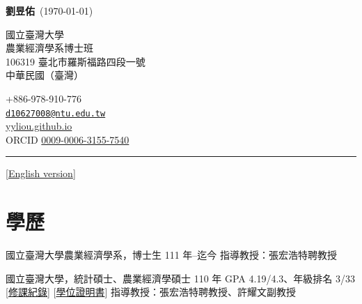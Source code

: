 \documentclass[11pt,letterpaper]{article}
\newlength{\cvindent}
\newlength{\cvcontactwidth}
\newcommand{\cvrule}{\par\noindent\hspace*{-\cvindent}%
  \rule{\dimexpr\textwidth+\cvindent\relax}{0.6pt}\par}
\begin{document}
\noindent\hspace*{-\cvindent}%
\begin{minipage}{\dimexpr\textwidth+\cvindent\relax}
  \raggedright
  {\large\bfseries 劉昱佑}\ {\normalsize (\apstylekinda\today)}

  \vspace{3pt}

  \noindent\hspace*{\cvindent}%
  \begin{minipage}[t]{\dimexpr\linewidth-\cvindent-\cvcontactwidth-1em\relax}\small\raggedright
    國立臺灣大學\\農業經濟學系博士班\\106319
臺北市羅斯福路四段一號\\中華民國（臺灣）
  \end{minipage}\hfill
  \begin{minipage}[t]{\cvcontactwidth}\small\raggedleft
    +886-978-910-776\\\href{mailto:d10627008@ntu.edu.tw}{\nolinkurl{d10627008@ntu.edu.tw}}\\\href{https://yyliou.github.io}{yyliou.github.io}\\ORCID
\href{https://orcid.org/0009-0006-3155-7540}{0009-0006-3155-7540}
  \end{minipage}
\end{minipage}

\vspace{6pt}
\cvrule
\vspace{-6pt}

{\raggedleft\small[\href{https://yyliou.github.io/yyliou/cv/cv_simple_metrics.pdf}{English version}]\par}

\section{學歷}\label{ux5b78ux6b77}

國立臺灣大學農業經濟學系，博士生 \hfill 111 年--迄今
\newline 指導教授：張宏浩特聘教授

國立臺灣大學，統計碩士、農業經濟學碩士 \hfill 110 年 \newline GPA
4.19/4.3、年級排名 3/33
{[}\href{https://yyliou.github.io/yyliou/cv/doc/ms-transcript-zh.pdf}{修課紀錄}{]}
{[}\href{https://yyliou.github.io/yyliou/cv/doc/ms-certificate-zh.pdf}{學位證明書}{]}
\newline 指導教授：張宏浩特聘教授、許耀文副教授
\end{document}
